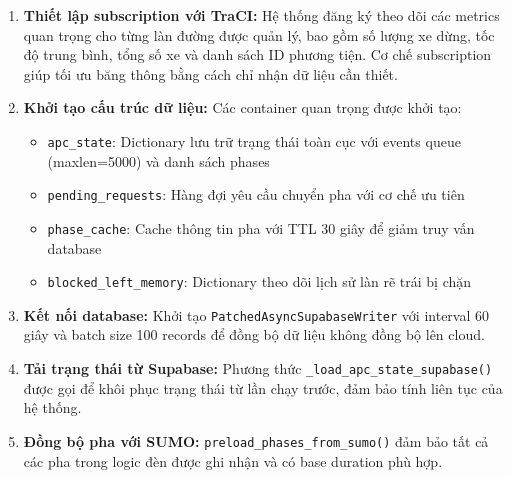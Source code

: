 \begin{enumerate}
    \item \textbf{Thiết lập subscription với TraCI:} Hệ thống đăng ký theo dõi các metrics quan trọng cho từng làn đường được quản lý, bao gồm số lượng xe dừng, tốc độ trung bình, tổng số xe và danh sách ID phương tiện. Cơ chế subscription giúp tối ưu băng thông bằng cách chỉ nhận dữ liệu cần thiết.
    
    \item \textbf{Khởi tạo cấu trúc dữ liệu:} Các container quan trọng được khởi tạo:
    \begin{itemize}
        \item \texttt{apc\_state}: Dictionary lưu trữ trạng thái toàn cục với events queue (maxlen=5000) và danh sách phases
        \item \texttt{pending\_requests}: Hàng đợi yêu cầu chuyển pha với cơ chế ưu tiên
        \item \texttt{phase\_cache}: Cache thông tin pha với TTL 30 giây để giảm truy vấn database
        \item \texttt{blocked\_left\_memory}: Dictionary theo dõi lịch sử làn rẽ trái bị chặn
    \end{itemize}
    
    \item \textbf{Kết nối database:} Khởi tạo \texttt{PatchedAsyncSupabaseWriter} với interval 60 giây và batch size 100 records để đồng bộ dữ liệu không đồng bộ lên cloud.
    
    \item \textbf{Tải trạng thái từ Supabase:} Phương thức \texttt{\_load\_apc\_state\_supabase()} được gọi để khôi phục trạng thái từ lần chạy trước, đảm bảo tính liên tục của hệ thống.
    
    \item \textbf{Đồng bộ pha với SUMO:} \texttt{preload\_phases\_from\_sumo()} đảm bảo tất cả các pha trong logic đèn được ghi nhận và có base duration phù hợp.
\end{enumerate}
